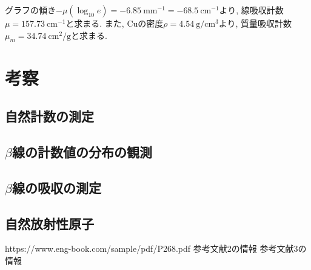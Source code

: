 \documentclass{jarticle}
\begin{document}
グラフの傾き$-\mu(\log_{10}e)=-6.85\ \mathrm{mm}^{-1}=-68.5\ \mathrm{cm}^{-1}$より, 線吸収計数$\mu=157.73\ \mathrm{cm}^{-1}$と求まる.
また, $\mathrm{Cu}$の密度$\rho=4.54\ \mathrm{g}/\mathrm{cm}^3$より\cite{金属の密度}, 質量吸収計数$\mu_m=34.74\ \mathrm{cm}^2/\mathrm{g}$と求まる.



\section{考察}


\subsection{自然計数の測定}


\subsection{$\beta$線の計数値の分布の観測}


\subsection{$\beta$線の吸収の測定}


\subsection{自然放射性原子}



\begin{thebibliography}{99}

   https://www.eng-book.com/sample/pdf/P268.pdf
   参考文献2の情報
   参考文献3の情報

\end{thebibliography}
\end{document}
